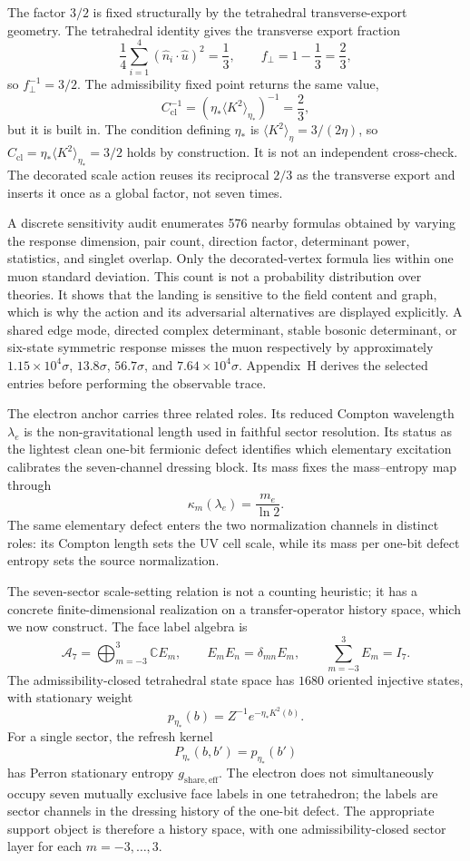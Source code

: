 \documentclass[11pt]{article}
\begin{document}
The factor $3/2$ is fixed structurally by the tetrahedral transverse-export geometry. The tetrahedral identity gives the transverse export fraction
\[
\frac14\sum_{i=1}^4(\hat n_i\cdot\hat u)^2=\frac13,
\qquad
f_\perp=1-\frac13=\frac23,
\]
so $f_\perp^{-1}=3/2$. The admissibility fixed point returns the same value,
\[
C_{\mathrm{cl}}^{-1}
=
\left(\eta_*\langle K^2\rangle_{\eta_*}\right)^{-1}
=
\frac23,
\]
but it is built in. The condition defining $\eta_*$ is $\langle K^2\rangle_\eta=3/(2\eta)$, so $C_{\mathrm{cl}}=\eta_*\langle K^2\rangle_{\eta_*}=3/2$ holds by construction. It is not an independent cross-check. The decorated scale action reuses its reciprocal $2/3$ as the transverse export and inserts it once as a global factor, not seven times.

A discrete sensitivity audit enumerates 576 nearby formulas obtained by varying the response dimension, pair count, direction factor, determinant power, statistics, and singlet overlap. Only the decorated-vertex formula lies within one muon standard deviation. This count is not a probability distribution over theories. It shows that the landing is sensitive to the field content and graph, which is why the action and its adversarial alternatives are displayed explicitly. A shared edge mode, directed complex determinant, stable bosonic determinant, or six-state symmetric response misses the muon respectively by approximately $1.15\times10^4\sigma$, $13.8\sigma$, $56.7\sigma$, and $7.64\times10^4\sigma$. Appendix~H derives the selected entries before performing the observable trace.

The electron anchor carries three related roles. Its reduced Compton wavelength $\lambda_e$ is the non-gravitational length used in faithful sector resolution. Its status as the lightest clean one-bit fermionic defect identifies which elementary excitation calibrates the seven-channel dressing block. Its mass fixes the mass--entropy map through
\[
\kappa_m(\lambda_e)=\frac{m_e}{\ln2}.
\]
The same elementary defect enters the two normalization channels in distinct roles: its Compton length sets the UV cell scale, while its mass per one-bit defect entropy sets the source normalization.

The seven-sector scale-setting relation is not a counting heuristic; it has a concrete finite-dimensional realization on a transfer-operator history space, which we now construct. The face label algebra is
\[
\mathcal A_7=\bigoplus_{m=-3}^{3}\mathbb C E_m,
\qquad
E_mE_n=\delta_{mn}E_m,
\qquad
\sum_{m=-3}^{3}E_m=I_7.
\]
The admissibility-closed tetrahedral state space has $1680$ oriented injective states, with stationary weight
\[
p_{\eta_*}(b)=Z^{-1}e^{-\eta_*K^2(b)}.
\]
For a single sector, the refresh kernel
\[
P_{\eta_*}(b,b')=p_{\eta_*}(b')
\]
has Perron stationary entropy $g_{\mathrm{share,eff}}$. The electron does not simultaneously occupy seven mutually exclusive face labels in one tetrahedron; the labels are sector channels in the dressing history of the one-bit defect. The appropriate support object is therefore a history space, with one admissibility-closed sector layer for each $m=-3,\ldots,3$.
\end{document}
